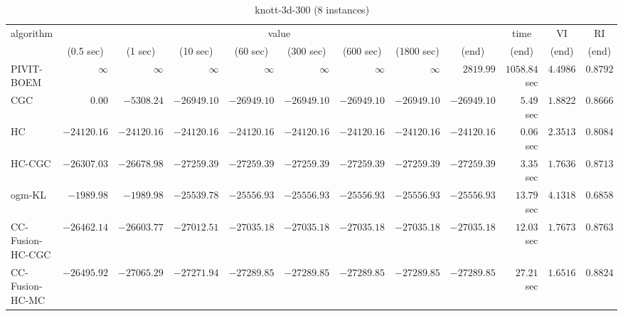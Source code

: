 \begin{table}[H]
\scriptsize
\centering
\caption{knott-3d-300 (8 instances)}
\label{tab:anytimetable-knott-3d-300}
\begin{tabular}{lrrrrrrrrrrr}
\toprule
           algorithm &                                   \multicolumn{8}{c}{value} & \multicolumn{1}{c}{time}    & \multicolumn{1}{c}{VI}  & \multicolumn{1}{c}{RI} \\  
\cmidrule(lr){2-9}\cmidrule(lr){10-10} \cmidrule(lr){11-11} \cmidrule(lr){12-12}   
                     & \multicolumn{1}{c}{(0.5 sec)} & \multicolumn{1}{c}{(1 sec)} & \multicolumn{1}{c}{(10 sec)} & \multicolumn{1}{c}{(60 sec)} & \multicolumn{1}{c}{(300 sec)} & \multicolumn{1}{c}{(600 sec)} & \multicolumn{1}{c}{(1800 sec)} & \multicolumn{1}{c}{(end)} & \multicolumn{1}{c}{(end)}    & \multicolumn{1}{c}{(end)}   & \multicolumn{1}{c}{(end)}  \\ \midrule 
          PIVIT-BOEM & $\infty$ & $\infty$ & $\infty$ & $\infty$ & $\infty$ & $\infty$ & $\infty$ & $      2819.99$ & $      1058.84$ sec    & $       4.4986$  & $       0.8792$ \\ 
                 CGC & $         0.00$ & $     -5308.24$ & $    -26949.10$ & $    -26949.10$ & $    -26949.10$ & $    -26949.10$ & $    -26949.10$ & $    -26949.10$ & $         5.49$ sec    & $       1.8822$  & $       0.8666$ \\ 
                  HC & $    -24120.16$ & $    -24120.16$ & $    -24120.16$ & $    -24120.16$ & $    -24120.16$ & $    -24120.16$ & $    -24120.16$ & $    -24120.16$ & $         0.06$ sec    & $       2.3513$  & $       0.8084$ \\ 
              HC-CGC & $    -26307.03$ & $    -26678.98$ & $    -27259.39$ & $    -27259.39$ & $    -27259.39$ & $    -27259.39$ & $    -27259.39$ & $    -27259.39$ & $         3.35$ sec    & $       1.7636$  & $       0.8713$ \\ 
              ogm-KL & $     -1989.98$ & $     -1989.98$ & $    -25539.78$ & $    -25556.93$ & $    -25556.93$ & $    -25556.93$ & $    -25556.93$ & $    -25556.93$ & $        13.79$ sec    & $       4.1318$  & $       0.6858$ \\ 
    CC-Fusion-HC-CGC & $    -26462.14$ & $    -26603.77$ & $    -27012.51$ & $    -27035.18$ & $    -27035.18$ & $    -27035.18$ & $    -27035.18$ & $    -27035.18$ & $        12.03$ sec    & $       1.7673$  & $       0.8763$ \\ 
     CC-Fusion-HC-MC & $    -26495.92$ & $    -27065.29$ & $    -27271.94$ & $    -27289.85$ & $    -27289.85$ & $    -27289.85$ & $    -27289.85$ & $    -27289.85$ & $        27.21$ sec    & $       1.6516$  & $       0.8824$ \\ 

\end{tabular}
\end{table}

